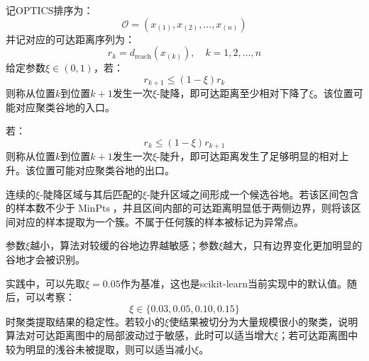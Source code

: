 \begin{method}[$\xi$聚类提取]
	记OPTICS排序为：
	\begin{equation*}
		\mathcal{O}=\left(x_{(1)},x_{(2)},\ldots,x_{(n)}\right)
	\end{equation*}
	并记对应的可达距离序列为：
	\begin{equation*}
		r_k=d_{\mathrm{reach}}\left(x_{(k)}\right),\quad k=1,2,\dots,n
	\end{equation*}
	给定参数$\xi\in(0,1)$，若：
	\begin{equation*}
		r_{k+1}\leqslant(1-\xi)r_k
	\end{equation*}
	则称从位置$k$到位置$k+1$发生一次$\xi$-陡降，即可达距离至少相对下降了$\xi$。该位置可能对应聚类谷地的入口。\par
	若：
	\begin{equation*}
		r_k\leqslant(1-\xi)r_{k+1}
	\end{equation*}
	则称从位置$k$到位置$k+1$发生一次$\xi$-陡升，即可达距离发生了足够明显的相对上升。该位置可能对应聚类谷地的出口。\par
	连续的$\xi$-陡降区域与其后匹配的$\xi$-陡升区域之间形成一个候选谷地。若该区间包含的样本数不少于$\operatorname{MinPts}$，并且区间内部的可达距离明显低于两侧边界，则将该区间对应的样本提取为一个簇。不属于任何簇的样本被标记为异常点。\par
	参数$\xi$越小，算法对较缓的谷地边界越敏感；参数$\xi$越大，只有边界变化更加明显的谷地才会被识别。\par
	实践中，可以先取$\xi=0.05$作为基准，这也是scikit-learn当前实现中的默认值。随后，可以考察：
	\begin{equation*}
		\xi\in\{0.03,0.05,0.10,0.15\}
	\end{equation*}
	时聚类提取结果的稳定性。若较小的$\xi$使结果被切分为大量规模很小的聚类，说明算法对可达距离图中的局部波动过于敏感，此时可以适当增大$\xi$；若可达距离图中较为明显的浅谷未被提取，则可以适当减小$\xi$。
\end{method}

